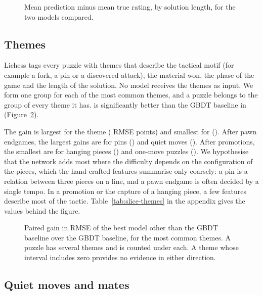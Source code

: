 \documentclass[11pt]{article}
\begin{document}
\begin{figure}[htbp]\centering
{}
\caption{Mean prediction minus mean true rating, by solution length, for the
two models compared.}
\label{fig:slice-moves}
\end{figure}

\subsection{Themes}

Lichess tags every puzzle with themes that describe the tactical motif (for
example a fork, a pin or a discovered attack), the material won, the phase of
the game and the length of the solution. No model receives the themes as
input. We form one group for each of the  most
common themes, and a puzzle belongs to the group of every theme it has.
 is significantly better than the GBDT baseline in
 (Figure~\ref{fig:themes}).

The gain is largest for the theme
\texttt{}
( RMSE points) and smallest for
\texttt{} ().
After pawn endgames, the largest gains are for pins
() and quiet moves
(). After promotions, the smallest are for
hanging pieces () and one-move puzzles
(). We hypothesise that the network adds most
where the difficulty depends on the configuration of the pieces, which the
hand-crafted features summarise only coarsely: a pin is a relation between
three pieces on a line, and a pawn endgame is often decided by a single
tempo. In a promotion or the capture of a hanging piece, a few features
describe most of the tactic. Table~\ref{tab:slice-themes} in the appendix
gives the values behind the figure.

\begin{figure}[htbp]\centering
{}
\caption{Paired gain in RMSE of the best model other than the GBDT baseline
over the GBDT baseline, for the  most common themes.
A puzzle has several themes and is counted under each. A theme whose interval
includes zero provides no evidence in either direction.}
\label{fig:themes}
\end{figure}

\subsection{Quiet moves and mates}
\end{document}
